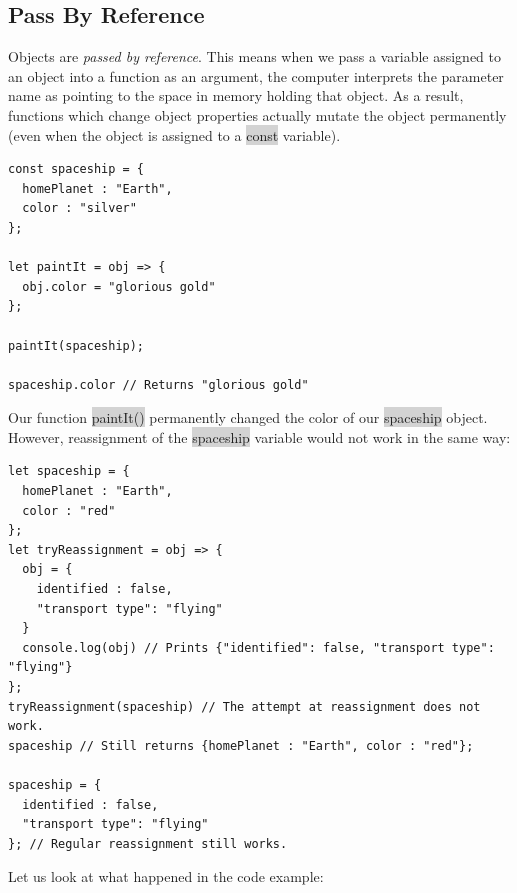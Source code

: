 \documentclass[11pt]{article}
\begin{document}
\subsection{Pass By Reference}
Objects are \textit{passed by reference}. This means when we pass a variable assigned to an object into a function as an argument, the computer interprets the parameter name as pointing to the space in memory holding that object. As a result, functions which change object properties actually mutate the object permanently (even when the object is assigned to a \colorbox{lightgray}{const} variable).
\begin{lstlisting}
const spaceship = {
  homePlanet : "Earth",
  color : "silver"
};

let paintIt = obj => {
  obj.color = "glorious gold"
};

paintIt(spaceship);

spaceship.color // Returns "glorious gold"
\end{lstlisting}
Our function \colorbox{lightgray}{paintIt()} permanently changed the color of our \colorbox{lightgray}{spaceship} object. However, reassignment of the \colorbox{lightgray}{spaceship} variable would not work in the same way:
\begin{lstlisting}
let spaceship = {
  homePlanet : "Earth",
  color : "red"
};
let tryReassignment = obj => {
  obj = {
    identified : false, 
    "transport type": "flying"
  }
  console.log(obj) // Prints {"identified": false, "transport type": "flying"}
};
tryReassignment(spaceship) // The attempt at reassignment does not work.
spaceship // Still returns {homePlanet : "Earth", color : "red"};

spaceship = {
  identified : false, 
  "transport type": "flying"
}; // Regular reassignment still works.
\end{lstlisting}
Let us look at what happened in the code example:
\end{document}
